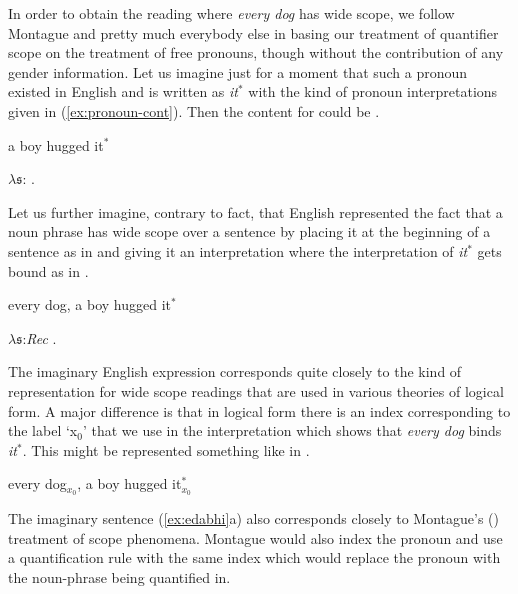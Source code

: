 In order to obtain the reading where \textit{every dog} has wide
scope, we follow Montague and pretty much everybody else in basing our
treatment of quantifier scope on the treatment of free pronouns,
though without the contribution of any gender information.  Let us
imagine just for a moment that such a pronoun existed in English and
is written as \textit{it$^*$} with the kind of pronoun interpretations
given in (\ref{ex:pronoun-cont}).  Then the content for  could be
.
\begin{ex} 
\begin{subex} 
 
\item a boy hugged it$^*$
 
\item $\lambda \mathfrak{s}$: . 
 
\end{subex} 
   
\end{ex}
Let us further imagine, contrary to fact, that English represented the fact
that a noun phrase has wide scope over a sentence by placing it at the
beginning of a sentence as in  and giving it an
interpretation where the interpretation of \textit{it$^*$} gets bound
as in .
\begin{ex} 
\begin{subex} 
 
\item every dog, a boy hugged it$^*$ 
 
\item $\lambda\mathfrak{s}$:\textit{Rec} . 
 
\end{subex} 
\label{ex:edabhi}   
\end{ex} 
The imaginary English expression  corresponds quite closely
to the kind of representation for wide scope readings that are used in
various theories of logical form.  A major difference is that in
logical form there is an index corresponding to the label `x$_0$' that
we use in the interpretation which shows that \textit{every dog} binds
\textit{it$^*$}.  This might be represented something like in
\nexteg{}.
\begin{ex} 
every dog$_{x_0}$, a boy hugged it$^*_{x_0}$ 
\end{ex} 
The imaginary sentence (\ref{ex:edabhi}a) also corresponds closely to
Montague's (\citeyear{Montague1973}) treatment of scope phenomena.
Montague would also index the pronoun and use a quantification rule
with the same index which would replace the pronoun with the
noun-phrase being quantified in.

